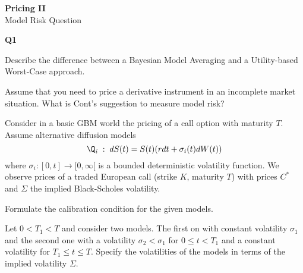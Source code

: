 \documentclass[11pt,a4paper,titlepage]{article}
\begin{document}
\setlength{\topmargin}{-2.5cm}

\begin{center} {\LARGE \bf Pricing II } \\[5mm]
                {\large Model Risk Question }
\end{center}

\vspace{0.3cm}

\pagestyle{empty}







\vspace{0.3cm}



	{\bf Q1}








	
Describe the difference between a Bayesian Model Averaging and a Utility-based Worst-Case
approach.


	Assume that you need to price a derivative instrument in an incomplete market situation. What is Cont's suggestion to measure model risk?


	
Consider in a basic GBM world the pricing of a call option with maturity $T$.
Assume alternative diffusion models
\begin{equation}
\Q_i\;:\; dS(t) = S(t)(r dt + \sigma_i(t) dW(t))
\end{equation}
where $ \sigma_i: [0,t] \rightarrow [0, \infty[ $ is a bounded deterministic volatility function.
We observe prices of a traded European call (strike $K$, maturity $T$) with prices $C^*$ and
$\Sigma$ the implied Black-Scholes volatility.








	
Formulate the calibration condition for the given models.


	
Let $0< T_1 <T$ and consider two models. The first on with constant volatility $\sigma_1$ and the second one with a volatility $\sigma_2 < \sigma _1$ for $0 \leq t <T_1$ and a constant volatility for $T_1\leq t \leq T$. Specify  the  volatilities of the models in terms of the implied volatility $\Sigma $.
\end{document}
